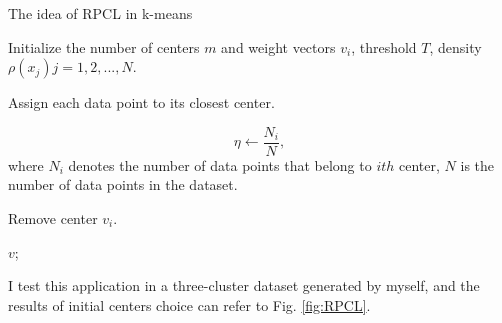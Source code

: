 \documentclass[12pt,a4paper]{article}
\theoremstyle{definition}
\begin{document}
\begin{algorithm}[H]
	\caption{The idea of RPCL in k-means}
	\label{alg:RPCL}
	\vspace{0.25\baselineskip}
	
	Initialize the number of centers $m$ and weight vectors $v_{i}$, threshold $T$, density $\rho(x_{j}) j = 1,2,...,N$.
	
	 {
	}
	
	Assign each data point to its closest center.
	
	 {
		\begin{equation*}
			\eta \leftarrow \dfrac{N_{i}}{N},
		\end{equation*}
		where $N_{i}$ denotes the number of data points that belong to $ith$ center, $N$ is the number of data points in the dataset.
		
		 {
			Remove center $v_{i}$.
		}
	}

	\Return $v$;
\end{algorithm}

\vspace{0.25\baselineskip}
I test this application in a three-cluster dataset generated by myself, and the results of initial centers choice can refer to Fig. \ref{fig:RPCL}.
\end{document}
